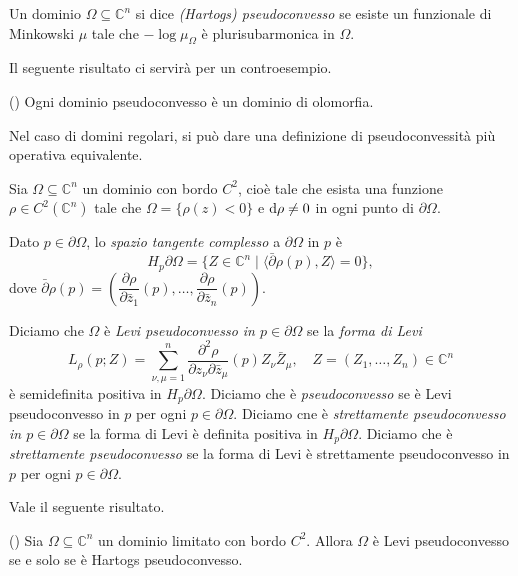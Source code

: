 \begin{defn}
    Un dominio $\Omega \subseteq \mathbb{C}^n$ si dice \textit{(Hartogs) pseudoconvesso} se esiste un funzionale di Minkowski $\mu$ tale che $-\log\mu_{\Omega}$ è plurisubarmonica in $\Omega$.
\end{defn}

 Il seguente risultato ci servirà per un controesempio.

 \begin{thm}
    (\cite[Theorem 5.1.2]{Kr}) Ogni dominio pseudoconvesso è un dominio di olomorfia.
 \end{thm}

Nel caso di domini regolari, si può dare una definizione di pseudoconvessità più operativa equivalente.

\begin{defn}
    Sia $\Omega \subseteq \mathbb{C}^n$ un dominio con bordo $C^2$, cioè tale che esista una funzione $\rho \in C^2(\mathbb{C}^n)$ tale che $\Omega=\{\rho(z)<0\}$ e $\mathop{}\!\mathrm{d}\rho\not=0$ in ogni punto di $\partial\Omega$.
    
    Dato $p \in \partial\Omega$, lo \textit{spazio tangente complesso} a $\partial\Omega$ in $p$ è
    $$H_p\partial\Omega=\{Z \in \mathbb{C}^n \mid \langle \bar{\partial}\rho(p),Z\rangle=0\},$$
    dove $\bar{\partial}\rho(p)=\left(\dfrac{\partial\rho}{\partial\bar{z}_1}(p),\dots,\dfrac{\partial\rho}{\partial\bar{z}_n}(p)\right)$.

    Diciamo che $\Omega$ è \textit{Levi pseudoconvesso in $p\in\partial\Omega$} se la \textit{forma di Levi}
    $$L_{\rho}(p;Z)=\sum_{\nu,\mu=1}^n \frac{\partial^2\rho}{\partial z_\nu\partial\bar{z}_\mu}(p)Z_\nu\bar{Z}_\mu, \quad Z=(Z_1,\dots,Z_n) \in \mathbb{C}^n$$
      è semidefinita positiva in $H_p\partial\Omega$. Diciamo che è \textit{pseudoconvesso} se è Levi pseudoconvesso in $p$ per ogni $p \in \partial\Omega$. Diciamo cne è \textit{strettamente pseudoconvesso in $p\in\partial\Omega$} se la forma di Levi è definita positiva in $H_p\partial\Omega$. Diciamo che è \textit{strettamente pseudoconvesso} se la forma di Levi è strettamente pseudoconvesso in $p$ per ogni $p \in \partial\Omega$.
\end{defn}

Vale il seguente risultato.
\begin{thm}
    (\cite[Theorem 3.3.5]{Kr}) Sia $\Omega \subseteq \mathbb{C}^n$ un dominio limitato con bordo $C^2$. Allora $\Omega$ è Levi pseudoconvesso se e solo se è Hartogs pseudoconvesso.
\end{thm}